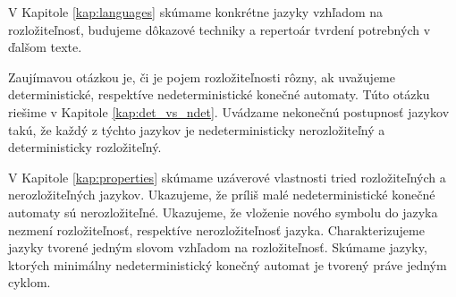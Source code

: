 V Kapitole \ref{kap:languages} skúmame konkrétne jazyky vzhľadom na rozložiteľnosť, budujeme dôkazové techniky a repertoár tvrdení potrebných v ďalšom texte.
\par
Zaujímavou otázkou je, či je pojem rozložiteľnosti rôzny, ak uvažujeme deterministické, respektíve nedeterministické konečné automaty. Túto otázku riešime v Kapitole \ref{kap:det_vs_ndet}. Uvádzame nekonečnú postupnosť jazykov takú, že každý z týchto jazykov je nedeterministicky nerozložiteľný a deterministicky rozložiteľný.
\par
V Kapitole \ref{kap:properties} skúmame uzáverové vlastnosti tried rozložiteľných a nerozložiteľných jazykov. Ukazujeme, že príliš malé nedeterministické konečné automaty sú nerozložiteľné. Ukazujeme, že vloženie nového symbolu do jazyka nezmení rozložiteľnosť, respektíve nerozložiteľnosť jazyka. Charakterizujeme jazyky tvorené jedným slovom vzhľadom na rozložiteľnosť. Skúmame jazyky, ktorých minimálny nedeterministický konečný automat je tvorený práve jedným cyklom.